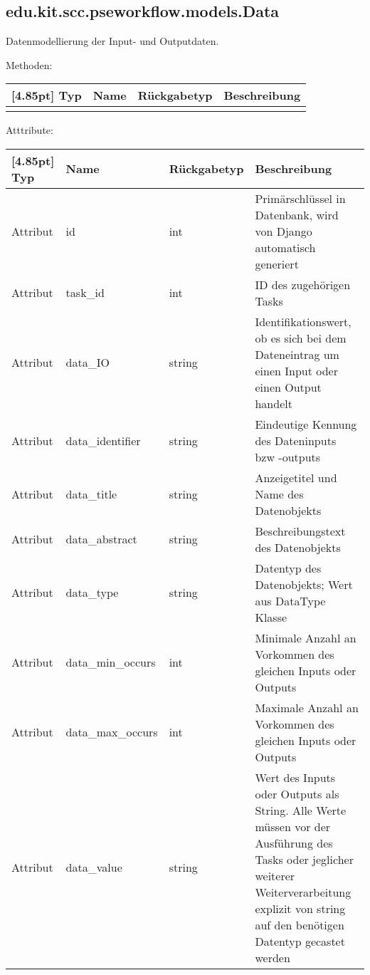             
         \subsection{edu.kit.scc.pseworkflow.models.Data}   
	         Datenmodellierung der Input- und Outputdaten.
	         
	         Methoden:
	         \begin{center}
	         	\setlength\tabcolsep{5pt}
	         	\renewcommand{\arraystretch}{1.5}
	         	
	         	\begin{tabularx}{\textwidth}{|l|l|l|X|}
	         		\hline
	         		\rowcolor[gray]{0.75}[4.85pt]
	         		Typ & Name & Rückgabetyp & Beschreibung \\ \hline 
	         		&&& \\
	         		\hline
	         	\end{tabularx}
	         \end{center}
	         
	         Atttribute:
	         \begin{center}
	         	\setlength\tabcolsep{5pt}
	         	\renewcommand{\arraystretch}{1.5}
	         	
	         	\begin{tabularx}{\textwidth}{|l|l|l|X|}
	         		\hline
	         		\rowcolor[gray]{0.75}[4.85pt]
	         		Typ & Name & Rückgabetyp & Beschreibung \\ \hline 
	         		Attribut & id & int & Primärschlüssel in Datenbank, wird von Django automatisch generiert \\ \hline
	         		Attribut & task\_id & int & ID des zugehörigen Tasks\\ \hline
	         		Attribut & data\_IO & string & Identifikationswert, ob es sich bei dem Dateneintrag um einen Input oder einen Output handelt\\ \hline
	         		Attribut & data\_identifier & string & Eindeutige Kennung des Dateninputs bzw -outputs\\ \hline
	         		Attribut & data\_title & string & Anzeigetitel und Name des Datenobjekts\\ \hline
	         		Attribut & data\_abstract & string & Beschreibungstext des Datenobjekts\\ \hline
	         		Attribut & data\_type & string & Datentyp des Datenobjekts; Wert aus DataType Klasse \\ \hline
	         		Attribut & data\_min\_occurs & int & Minimale Anzahl an Vorkommen des gleichen Inputs oder Outputs \\ \hline
	         		Attribut & data\_max\_occurs & int & Maximale Anzahl an Vorkommen des gleichen Inputs oder Outputs \\ \hline
	         		Attribut & data\_value & string & Wert des Inputs oder Outputs als String. Alle Werte müssen vor der Ausführung des Tasks oder jeglicher weiterer Weiterverarbeitung explizit von string auf den benötigen Datentyp gecastet werden\\
	         		\hline
	         	\end{tabularx}
	         \end{center}
            
